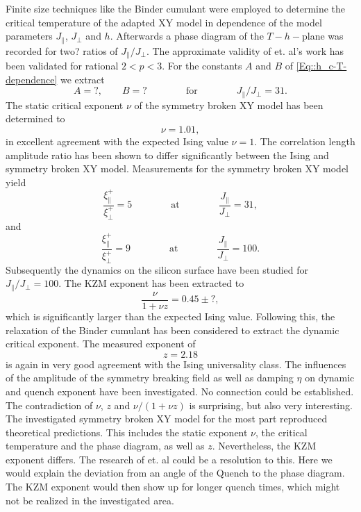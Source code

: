 	Finite size techniques like the Binder cumulant were employed to determine the critical temperature of the adapted XY model in dependence of the model parameters $J_\parallel$, $J_\perp$ and $h$. Afterwards a phase diagram of the $T-h-$plane was recorded for two? ratios of $J_\parallel /	J_\perp$. The approximate validity of \cite{jose1977renormalization} et. al's work has been validated for rational $2 < p < 3$. For the constants $A$ and $B$ of \eqref{Eq::h_c-T-dependence} we extract
	\begin{equation}
		A = ?, \qquad B = ? \qquad \qquad \text{for} \qquad \qquad J_\parallel /	J_\perp =	31.
	\end{equation}
	The static critical exponent $\nu$ of the symmetry broken XY model has been determined to 
	\begin{equation}
		\nu =	1.01,
	\end{equation}
	in excellent agreement with the expected Ising value $\nu =	1$. The correlation length amplitude ratio has been shown to differ significantly between the Ising and symmetry broken XY model. Measurements for the symmetry broken XY model yield
	\begin{equation}
		\frac{\xi^+_\parallel}{\xi^+_\perp} = 5 \qquad \qquad \text{at} \qquad \qquad \frac{J_\parallel}{J_\perp} =	31,
	\end{equation}
	and
	\begin{equation}
		\frac{\xi^+_\parallel}{\xi^+_\perp} = 9 \qquad \qquad \text{at} \qquad \qquad \frac{J_\parallel}{J_\perp} =	100.
	\end{equation}
	Subsequently the dynamics on the silicon surface have been studied for $J_\parallel /	J_\perp = 100$. The KZM	exponent has been extracted to 
	\begin{equation}
		\frac{\nu}{1 + \nu z} =	0.45 \pm ?,
	\end{equation}
	which is significantly larger than the expected Ising value. Following this, the relaxation of the Binder cumulant has been considered to extract the dynamic critical exponent. The measured exponent of
	\begin{equation}
		z =	2.18
	\end{equation}	
	is again in very good agreement with the Ising universality class. The influences of the amplitude of the symmetry breaking field as well as damping $\eta$ on dynamic and quench exponent have been investigated. No connection could be established. \\
	
	The contradiction of $\nu$, $z$ and $\nu / (1 + \nu z)$ is surprising, but also very interesting. The investigated symmetry broken XY model for the most part reproduced theoretical predictions. This includes the static exponent $\nu$, the critical temperature and the phase diagram, as well as $z$. Nevertheless, the KZM exponent differs. The research of \cite{ladewig2020kibble} et. al could be a resolution to this. Here we would explain the deviation from an angle of the Quench to the phase diagram. The KZM exponent would then show up for longer quench times, which might not be realized in the investigated area.
